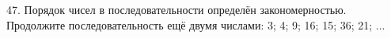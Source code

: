 47. Порядок чисел в последовательности определён закономерностью. Продолжите последовательность ещё двумя числами: 3; 4; 9; 16; 15; 36; 21; ...\\

